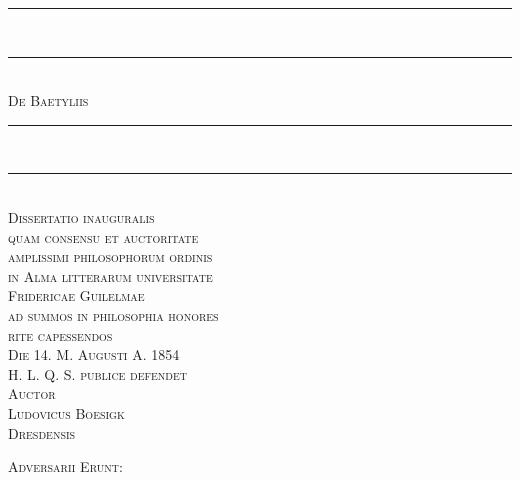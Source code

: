 \documentclass[a4paper, 11pt, oneside, polutonikogreek, german]{article}
\begin{document}
\begin{titlepage}
    \centering                     %

    \rule{\textwidth}{1.6pt}\\[-\baselineskip]\vskip2pt
    \rule{\textwidth}{0.4pt}\\[1\baselineskip]

    {\scshape\Huge De Baetyliis}\\[1\baselineskip]

    \rule{\textwidth}{0.4pt}\\[-\baselineskip]\vskip3.2pt
    \rule{\textwidth}{1.6pt}\\[1\baselineskip]

    {\scshape\small%
      Dissertatio inauguralis \\
      quam consensu et auctoritate \\
      amplissimi philosophorum ordinis \\
      in Alma litterarum universitate \\
      Fridericae Guilelmae \\
      ad summos in philosophia honores \\
      rite capessendos}%
    \\[1\baselineskip]

    {\scshape\small%
      Die 14. M. Augusti A. 1854\\
      H. L. Q. S. publice defendet\\
      Auctor\\[0.5\baselineskip]
      \Large Ludovicus Boesigk\\
      \large Dresdensis}%
    \\[0.5\baselineskip]

    \vfill
    {\footnotesize\scshape
    Adversarii Erunt:
    
}
\end{titlepage}
\end{document}
